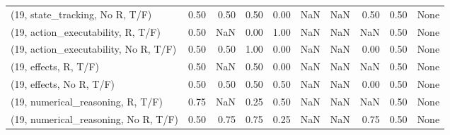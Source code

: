 \begin{table*}[h!]
\begin{adjustbox}{width=2\columnwidth,center}
\begin{tabular}{lrrr|rrr|rrr}
(19, state\_tracking, No R, T/F)       &                      0.50 &                  0.50 &                      0.50 &                          0.00 &                       NaN &                           NaN &                                   0.50 &                               0.50 &                                  None \\
(19, action\_executability, R, T/F)    &                      0.50 &                   NaN &                      0.00 &                          1.00 &                       NaN &                           NaN &                                    NaN &                               0.50 &                                  None \\
(19, action\_executability, No R, T/F) &                      0.50 &                  0.50 &                      1.00 &                          0.00 &                       NaN &                           NaN &                                   0.00 &                               0.50 &                                  None \\
(19, effects, R, T/F)                 &                      0.50 &                   NaN &                      0.50 &                          0.00 &                       NaN &                           NaN &                                    NaN &                               0.50 &                                  None \\
(19, effects, No R, T/F)              &                      0.50 &                  0.50 &                      0.50 &                          0.50 &                       NaN &                           NaN &                                   0.00 &                               0.50 &                                  None \\
(19, numerical\_reasoning, R, T/F)     &                      0.75 &                   NaN &                      0.25 &                          0.50 &                       NaN &                           NaN &                                    NaN &                               0.50 &                                  None \\
(19, numerical\_reasoning, No R, T/F)  &                      0.50 &                  0.75 &                      0.75 &                          0.25 &                       NaN &                           NaN &                                   0.75 &                               0.50 &                                  None \\

\end{tabular}
\end{adjustbox}
\end{table*}
